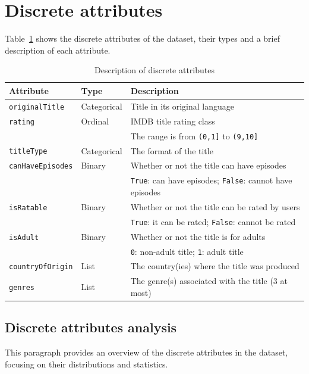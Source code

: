 \section{Discrete attributes}
Table~\ref{tab:attributes} shows the discrete attributes of the dataset,
their types and a brief description of each attribute.
\begin{table}[h]
    \centering
    \begin{tabular}{|l|l|l|} %
        \hline
        \textbf{Attribute} & \textbf{Type} & \textbf{Description} \\ 
        \hline
        \texttt{originalTitle} & Categorical & Title in its original language \\  
        \hline
        \texttt{rating} & Ordinal & IMDB title rating class \\
        & & The range is from \texttt{(0,1]} to \texttt{(9,10]} \\ 
        \hline
        \texttt{titleType} & Categorical & The format of the title \\ 
        \hline
        \texttt{canHaveEpisodes} & Binary & Whether or not the title can have episodes \\ 
        & & \texttt{True}: can have episodes; \texttt{False}: cannot have episodes \\ 
        \hline
        \texttt{isRatable} & Binary & Whether or not the title can be rated by users \\ 
        & & \texttt{True}: it can be rated; \texttt{False}: cannot be rated \\ 
        \hline
        \texttt{isAdult} & Binary & Whether or not the title is for adults \\ 
        & & \texttt{0}: non-adult title; \texttt{1}: adult title \\ 
        \hline
        \texttt{countryOfOrigin} & List & The country(ies) where the title was produced \\ 
        \hline
        \texttt{genres} & List & The genre(s) associated with the title (3 at most) \\ 
        \hline
    \end{tabular}
    \caption{Description of discrete attributes}
    \label{tab:attributes}
\end{table}

\subsection{Discrete attributes analysis}
This paragraph provides an overview of the discrete attributes in the dataset, focusing on their distributions and statistics.\\

